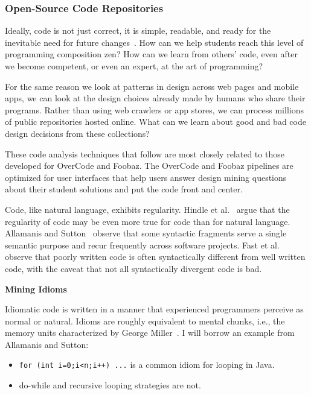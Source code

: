 \subsubsection{Open-Source Code Repositories}

Ideally, code is not just correct, it is simple, readable, and ready for the inevitable need for future changes~\cite{peters2010zen,6005notes}. How can we help students reach this level of programming composition zen? How can we learn from others' code, even after we become competent, or even an expert, at the art of programming?

For the same reason we look at patterns in design across web pages and mobile apps, we can look at the design choices already made by humans who share their programs. Rather than using web crawlers or app stores, we can process millions of public repositories hosted online. What can we learn about good and bad code design decisions from these collections?

These code analysis techniques that follow are most closely related to those developed for OverCode and Foobaz. The OverCode and Foobaz pipelines are optimized for user interfaces that help users answer design mining questions about their student solutions and put the code front and center. 

Code, like natural language, exhibits regularity. Hindle et al.~\cite{Hindle2012} argue that the regularity of code may be even more true for code than for natural language. Allamanis and Sutton~\cite{allamanis2014mining} observe that some syntactic fragments serve a single semantic purpose and recur frequently across software projects. Fast et al.~\cite{codex} observe that poorly written code is often syntactically different from well written code, with the caveat that not all syntactically divergent code is bad.

{\bf Mining Idioms}

Idiomatic code is written in a manner that experienced programmers perceive as normal or natural. Idioms are roughly equivalent to mental chunks, i.e., the memory units characterized by George Miller~\cite{chunking}. I will borrow an example from Allamanis and Sutton:~\cite{allamanis2014mining}

\begin{itemize}
\item \texttt{for (int i=0;i<n;i++) ...} is a common idiom for looping in Java.
\item do-while and recursive looping strategies are not.
\end{itemize}

